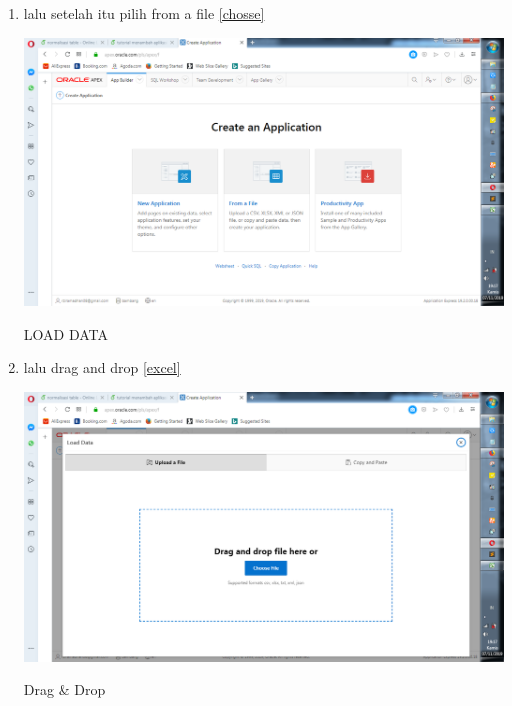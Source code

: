 \documentclass{article}
\begin{document}
\begin{enumerate}
    \item 
    lalu setelah itu pilih from a file
      \ref{chosse}
    \begin{center}
         \centering
            \includegraphics[scale=0.27]{gambar/8.png}
        \caption{LOAD DATA}
        \label{chosse}
    \end{center}
    
     \item lalu drag and drop
      \ref{excel}
    \begin{center}
         \centering
            \includegraphics[scale=0.27]{gambar/9.png}
        \caption{Drag & Drop}
        \label{excel}
    \end{center}
    

\end{enumerate}
\end{document}
